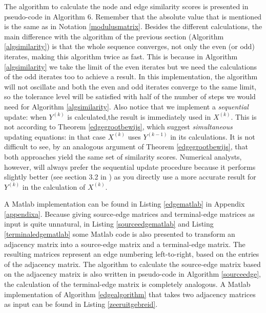 \documentclass[a4paper,11pt]{report}
\begin{document}
 The algorithm to calculate the node and edge similarity scores is presented in pseudo-code in Algorithm 6. 
 Remember that the absolute value that is mentioned is the same as in Notation 
 \ref{modulusmatrix}. Besides the different calculations, the main difference with the algorithm of the previous section (Algorithm \ref{algsimilarity})
 is that the whole sequence converges, not only the even (or odd) iterates, 
 making this algorithm twice as fast. This is because in Algorithm \ref{algsimilarity} we take the limit
 of the even iterates but we need the calculations of the odd iterates too to achieve a result. In this
 implementation, the algorithm will not oscillate and both the even and odd iterates converge to the same limit, so the tolerance level will
 be satisfied with half of the number of steps we would need for Algorithm \ref{algsimilarity}. Also notice that we implement a \textit{sequential} 
 update: when $Y^{(k)}$ is calculated,the result is immediately used in 
 $X^{(k)}$. This is not according to Theorem \ref{edgegrootbewijs}, which 
 suggest \textit{simultaneous} updating equations: in that case $X^{(k)}$ uses $Y^{(k-1)}$ 
 in its calculations. It is not difficult to see, by an analogous argument of 
 Theorem \ref{edgegrootbewijs}, that both approaches yield the same set of 
 similarity scores. Numerical analysts, however, will always prefer the sequential
 update procedure because it performs slightly better (see section 3.2 in \cite{numeriekewiskunde}) as you directly use a more accurate 
 result for $Y^{(k)}$ in the calculation of $X^{(k)}$. 
 
 A Matlab implementation 
 can be found in Listing \ref{edgematlab} in Appendix \ref{appendixa}. Because giving source-edge matrices and terminal-edge matrices as input
 is quite unnatural, in Listing \ref{sourceedgematlab} and Listing \ref{terminaledgematlab} 
 some Matlab code is also presented to transform an adjacency matrix into a 
 source-edge matrix and a terminal-edge matrix. The resulting matrices represent an edge numbering left-to-right, based on the entries of the adjacency matrix. The algorithm to calculate the 
 source-edge matrix based on the adjacency matrix is also written in pseudo-code in Algorithm 
 \ref{sourceedge}, the calculation of the terminal-edge matrix is completely 
 analogous. A Matlab implementation of Algorithm \ref{edgealgorithm} that takes 
 two adjacency matrices as input can be found in Listing \ref{zeeruitgebreid}.
 
\end{document}
